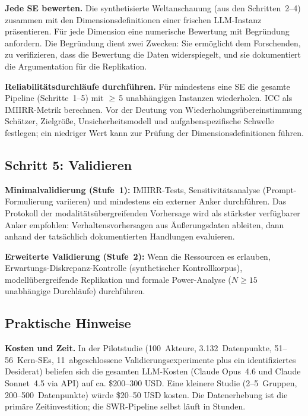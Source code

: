 \documentclass[11pt,a4paper]{article}
\begin{document}
\textbf{Jede SE bewerten.} Die synthetisierte Weltanschauung (aus den Schritten~2--4) zusammen mit den Dimensionsdefinitionen einer frischen LLM-Instanz präsentieren. Für jede Dimension eine numerische Bewertung mit Begründung anfordern. Die Begründung dient zwei Zwecken: Sie ermöglicht dem Forschenden, zu verifizieren, dass die Bewertung die Daten widerspiegelt, und sie dokumentiert die Argumentation für die Replikation.

\textbf{Reliabilitätsdurchläufe durchführen.} Für mindestens eine SE die gesamte Pipeline (Schritte~1--5) mit $\geq$\,5 unabhängigen Instanzen wiederholen. ICC als IMIIRR-Metrik berechnen. Vor der Deutung von Wiederholungsübereinstimmung Schätzer, Zielgröße, Unsicherheitsmodell und aufgabenspezifische Schwelle festlegen; ein niedriger Wert kann zur Prüfung der Dimensionsdefinitionen führen.

\subsection{Schritt 5: Validieren}
\label{sec:app:step5}

\textbf{Minimalvalidierung (Stufe~1):} IMIIRR-Tests, Sensitivitätsanalyse (Prompt-Formulierung variieren) und mindestens ein externer Anker durchführen. Das Protokoll der modalitätsübergreifenden Vorhersage wird als stärkster verfügbarer Anker empfohlen: Verhaltensvorhersagen aus Äußerungsdaten ableiten, dann anhand der tatsächlich dokumentierten Handlungen evaluieren.

\textbf{Erweiterte Validierung (Stufe~2):} Wenn die Ressourcen es erlauben, Erwartungs-Diskrepanz-Kontrolle (synthetischer Kontrollkorpus), modellübergreifende Replikation und formale Power-Analyse ($N \geq 15$ unabhängige Durchläufe) durchführen.


\subsection{Praktische Hinweise}
\label{sec:app:practical}

\textbf{Kosten und Zeit.} In der Pilotstudie (100~Akteure, 3.132~Datenpunkte, 51--56~Kern-SEs, 11~abgeschlossene Validierungsexperimente plus ein identifiziertes Desiderat) beliefen sich die gesamten LLM-Kosten (Claude Opus~4.6 und Claude Sonnet~4.5 via API) auf ca. \$200--300 USD. Eine kleinere Studie (2--5~Gruppen, 200--500~Datenpunkte) würde \$20--50 USD kosten. Die Datenerhebung ist die primäre Zeitinvestition; die SWR-Pipeline selbst läuft in Stunden.
\end{document}

